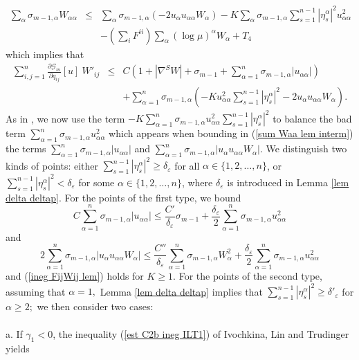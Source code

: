 \documentclass[10pt,reqno,oneside]{amsart}
\theoremstyle{definition}
\theoremstyle{remark}
\begin{document}
\begin{eqnarray*}
\sum_{\alpha}\sigma_{m-1,\alpha}W_{\alpha\alpha}&\leq& \sum_{\alpha}\sigma_{m-1,\alpha}(-2u_{\alpha}u_{\alpha\alpha}W_{\alpha})-K\sum_{\alpha}\sigma_{m-1,\alpha}\sum_{s=1}^{n-1}|\eta_s^{\alpha}|^2u_{\alpha\alpha}^2\\
&&-(\sum_iF^{ii})\sum_{\alpha}(\log\mu)^{\alpha}W_{\alpha}+T_4
\end{eqnarray*}
which implies that
\begin{eqnarray}
\sum_{i,j=1}^n\frac{\partial \mathcal{G}_m}{\partial q_{ij}}[u]\ W'_{ij}&\leq&  C\left(1+|\nabla^S W|+\sigma_{m-1}+\sum_{\alpha=1}^n\sigma_{m-1,\alpha}|u_{\alpha\alpha}|\right)\nonumber\\
&&+\sum_{\alpha=1}^n\sigma_{m-1,\alpha}\left(-Ku_{\alpha \alpha}^2\sum_{s=1}^{n-1}|\eta^{\alpha}_s|^2-2u_{\alpha}u_{\alpha\alpha}W_{\alpha}\right).\label{sum Waa lem interm}
\end{eqnarray}
As in \cite{Bay1}, we now use the term $-K\sum_{\alpha=1}^n\sigma_{m-1,\alpha}u_{\alpha \alpha}^2\sum_{s=1}^{n-1}|\eta^{\alpha}_s|^2$ to balance the bad term $\sum_{\alpha=1}^n\sigma_{m-1,\alpha}u_{\alpha\alpha}^2$ which appears when bounding in (\ref{sum Waa lem interm}) the terms $\sum_{\alpha=1}^n\sigma_{m-1,\alpha}|u_{\alpha\alpha}|$ and $\sum_{\alpha=1}^n\sigma_{m-1,\alpha}|u_{\alpha}u_{\alpha\alpha}W_\alpha|.$ We distinguish two kinds of points: either $\sum_{s=1}^{n-1}|\eta^{\alpha}_s|^2\geq\delta_{\varepsilon}$ for all $\alpha\in\{1,2,\ldots,n\}$, or $\sum_{s=1}^{n-1}|\eta^{\alpha}_s|^2<\delta_{\varepsilon}$ for some $\alpha\in\{1,2,\ldots,n\}$, where $\delta_{\varepsilon}$ is introduced in Lemma \ref{lem delta deltap}. For the points of the first type, we bound 
$$C\sum_{\alpha=1}^n\sigma_{m-1,\alpha}|u_{\alpha\alpha}|\leq \frac{C'}{\delta_{\varepsilon}}\sigma_{m-1}+\frac{\delta_{\varepsilon}}{2}\sum_{\alpha=1}^n\sigma_{m-1,\alpha}u_{\alpha\alpha}^2$$
and 
$$2\sum_{\alpha=1}^n\sigma_{m-1,\alpha}|u_{\alpha}u_{\alpha\alpha}W_\alpha|\leq \frac{C''}{\delta_{\varepsilon}}\sum_{\alpha=1}^n\sigma_{m-1,\alpha}W_\alpha^2+\frac{\delta_{\varepsilon}}{2}\sum_{\alpha=1}^n\sigma_{m-1,\alpha}u_{\alpha\alpha}^2$$
and (\ref{ineg FijWij lem}) holds for $K\geq 1.$ For the points of the second type, assuming that $\alpha=1,$ Lemma \ref{lem delta deltap} implies that  $\sum_{s=1}^{n-1}|\eta^{\alpha}_s|^2\geq \delta'_{\varepsilon}$ for $\alpha\geq 2;$ we then consider two cases: 
\\
\\a. If $\gamma_1< 0$, the inequality (\ref{est C2b ineg ILT1}) of Ivochkina, Lin and Trudinger yields
\end{document}
